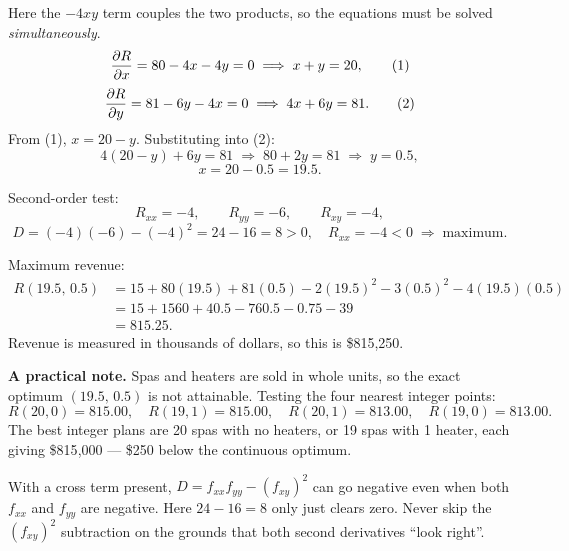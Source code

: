 \begin{solution}
Here the $-4xy$ term couples the two products, so the equations must be solved
\emph{simultaneously}.
\[
\frac{\partial R}{\partial x}=80-4x-4y=0 \;\Longrightarrow\; x+y=20, \tag{1}
\]
\[
\frac{\partial R}{\partial y}=81-6y-4x=0 \;\Longrightarrow\; 4x+6y=81. \tag{2}
\]
From (1), $x=20-y$. Substituting into (2):
\[
4(20-y)+6y=81 \;\Longrightarrow\; 80+2y=81 \;\Longrightarrow\; y=0.5,
\]
\[
x=20-0.5=19.5 .
\]

Second-order test:
\[
R_{xx}=-4,\qquad R_{yy}=-6,\qquad R_{xy}=-4,
\]
\[
D=(-4)(-6)-(-4)^{2}=24-16=8>0,\quad R_{xx}=-4<0
\;\Longrightarrow\; \text{maximum}.
\]

Maximum revenue:
\[
\begin{aligned}
R(19.5,\,0.5)&=15+80(19.5)+81(0.5)-2(19.5)^{2}-3(0.5)^{2}-4(19.5)(0.5)\\
&=15+1560+40.5-760.5-0.75-39\\
&=815.25 .
\end{aligned}
\]
Revenue is measured in thousands of dollars, so this is \$815{,}250.

\medskip
\textbf{A practical note.} Spas and heaters are sold in whole units, so the
exact optimum $(19.5,\,0.5)$ is not attainable. Testing the four nearest
integer points:
\[
R(20,0)=815.00,\quad R(19,1)=815.00,\quad R(20,1)=813.00,\quad R(19,0)=813.00 .
\]
The best integer plans are 20 spas with no heaters, or 19 spas with 1 heater,
each giving \$815{,}000 --- \$250 below the continuous optimum.

\end{solution}

\begin{pitfall}
With a cross term present, $D=f_{xx}f_{yy}-(f_{xy})^{2}$ can go negative even
when both $f_{xx}$ and $f_{yy}$ are negative. Here $24-16=8$ only just clears
zero. Never skip the $(f_{xy})^{2}$ subtraction on the grounds that both second
derivatives ``look right''.
\end{pitfall}

